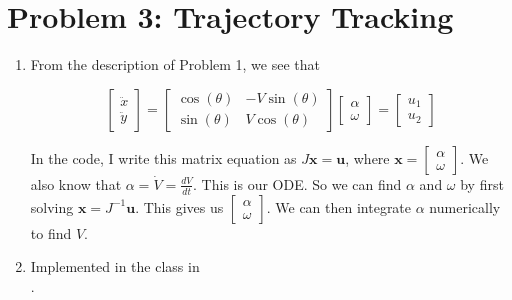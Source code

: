 \documentclass{article}
\begin{document}
\begin{enumerate}[label=(\roman*)]
\end{enumerate}

\newpage

\section*{Problem 3: Trajectory Tracking}
\begin{enumerate}[label=(\roman*)]

\item From the description of Problem 1, we see that

$$\begin{bmatrix}\ddot{x} \\ \ddot{y}\end{bmatrix} = \begin{bmatrix}\cos(\theta) & -V\sin(\theta) \\ \sin(\theta) & V\cos(\theta)\end{bmatrix} \begin{bmatrix} \alpha \\ \omega \end{bmatrix} = \begin{bmatrix}u_1 \\ u_2 \end{bmatrix}$$

In the code, I write this matrix equation as $J\mathbf{x} = \mathbf{u}$, where $\mathbf{x} = \begin{bmatrix}\alpha \\ \omega \end{bmatrix}$. We also know that $\alpha = \dot{V} = \frac{dV}{dt}$. This is our ODE. So we can find $\alpha$ and $\omega$ by first solving $\mathbf{x} = J^{-1}\mathbf{u}$. This gives us $\begin{bmatrix}\alpha \\ \omega \end{bmatrix}$. We can then integrate $\alpha$ numerically to find $V$.

\item Implemented  in the  class in \\ .


\end{enumerate}
\end{document}
